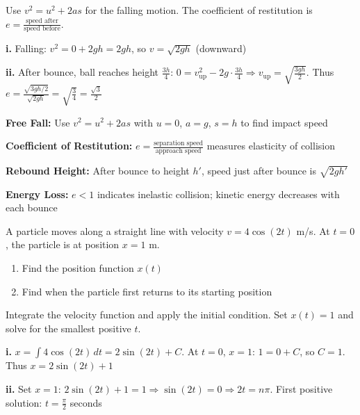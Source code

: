 \begin{hint}
Use $v^2 = u^2 + 2as$ for the falling motion. The coefficient of restitution is $e = \frac{\text{speed after}}{\text{speed before}}$.
\end{hint}

\begin{solution}
\textbf{i.} Falling: $v^2 = 0 + 2gh = 2gh$, so $v = \sqrt{2gh}$ (downward)

\textbf{ii.} After bounce, ball reaches height $\frac{3h}{4}$: $0 = v_{\text{up}}^2 - 2g \cdot \frac{3h}{4} \Rightarrow v_{\text{up}} = \sqrt{\frac{3gh}{2}}$. Thus $e = \frac{\sqrt{3gh/2}}{\sqrt{2gh}} = \sqrt{\frac{3}{4}} = \frac{\sqrt{3}}{2}$
\end{solution}

\begin{takeaways}
\item \textbf{Free Fall:} Use $v^2 = u^2 + 2as$ with $u = 0$, $a = g$, $s = h$ to find impact speed
\item \textbf{Coefficient of Restitution:} $e = \frac{\text{separation speed}}{\text{approach speed}}$ measures elasticity of collision
\item \textbf{Rebound Height:} After bounce to height $h'$, speed just after bounce is $\sqrt{2gh'}$
\item \textbf{Energy Loss:} $e < 1$ indicates inelastic collision; kinetic energy decreases with each bounce
\end{takeaways}

\begin{problem}[Integration]
A particle moves along a straight line with velocity $v = 4\cos(2t)$ m/s. At $t = 0$, the particle is at position $x = 1$ m.

\begin{enumerate}[label=\textbf{\roman*.}]
    \item Find the position function $x(t)$
    \item Find when the particle first returns to its starting position
\end{enumerate}
\end{problem}

\begin{hint}
Integrate the velocity function and apply the initial condition. Set $x(t) = 1$ and solve for the smallest positive $t$.
\end{hint}

\begin{solution}
\textbf{i.} $x = \int 4\cos(2t)\,dt = 2\sin(2t) + C$. At $t=0$, $x=1$: $1 = 0 + C$, so $C = 1$. Thus $x = 2\sin(2t) + 1$

\textbf{ii.} Set $x = 1$: $2\sin(2t) + 1 = 1 \Rightarrow \sin(2t) = 0 \Rightarrow 2t = n\pi$. First positive solution: $t = \frac{\pi}{2}$ seconds
\end{solution}

